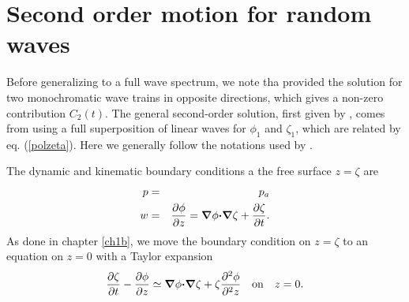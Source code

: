 \section{Second order motion for random waves}
Before generalizing to a full wave spectrum, we note tha \cite{Miche1944b} provided the solution for two monochromatic wave 
trains in opposite directions, which gives a non-zero contribution $C_2(t)$. 
The general second-order solution, first given by \cite{Biesel1952}, comes from using a full superposition of linear waves for 
$\phi_1$ and $\zeta_1$, which are related by  eq. (\ref{polzeta}). Here we generally follow the notations 
used by  \cite{Hasselmann1962}.

The dynamic and kinematic  boundary conditions a the free surface  $z=\zeta$ are 
\begin{eqnarray}
    p&=&p_a \\
      w&=&\frac{\partial \phi }{\partial z}= \mbox{\boldmath $\nabla$} {\mathbf \phi}\mbox{\boldmath $\cdot$}\mbox{\boldmath $\nabla$} \zeta
    + \frac{\partial \zeta }{\partial t}.
\end{eqnarray}
As done in chapter \ref{ch1b}, we move the boundary condition on $z=\zeta$ to an equation  on $z=0$ with a Taylor expansion 
\begin{equation}
     \frac{\partial \zeta }{\partial t} -  \frac{\partial \phi }{\partial z} \simeq 
\mbox{\boldmath $\nabla$} {\mathbf \phi}\mbox{\boldmath $\cdot$}\mbox{\boldmath $\nabla$} \zeta    + \zeta \frac{\partial^2 \phi }{\partial^2 z} \quad \mathrm{on} \quad z=0. \label{surf_kine_Taylor}
\end{equation}

